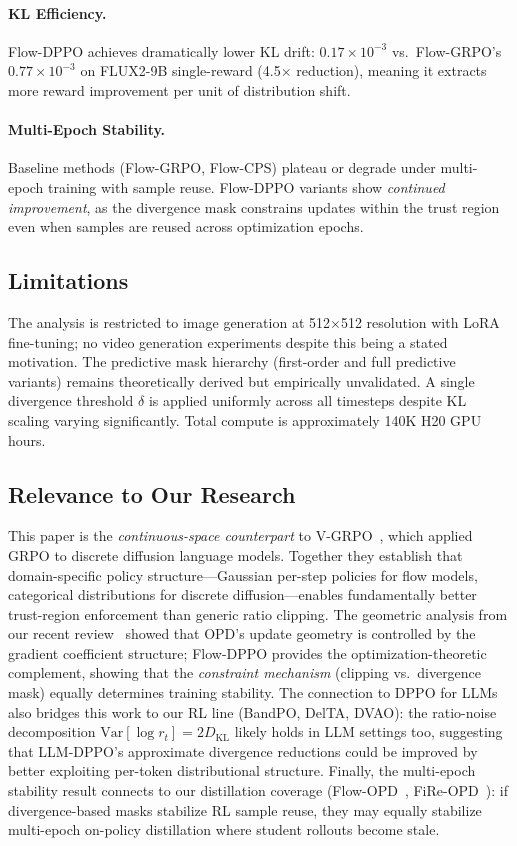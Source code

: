 \documentclass[11pt,a4paper]{article}
\begin{document}
\paragraph{KL Efficiency.} Flow-DPPO achieves dramatically lower KL drift: $0.17 \times 10^{-3}$ vs.\ Flow-GRPO's $0.77 \times 10^{-3}$ on FLUX2-9B single-reward (4.5$\times$ reduction), meaning it extracts more reward improvement per unit of distribution shift.

\paragraph{Multi-Epoch Stability.} Baseline methods (Flow-GRPO, Flow-CPS) plateau or degrade under multi-epoch training with sample reuse. Flow-DPPO variants show \emph{continued improvement}, as the divergence mask constrains updates within the trust region even when samples are reused across optimization epochs.

\subsection{Limitations}

The analysis is restricted to image generation at 512$\times$512 resolution with LoRA fine-tuning; no video generation experiments despite this being a stated motivation. The predictive mask hierarchy (first-order and full predictive variants) remains theoretically derived but empirically unvalidated. A single divergence threshold $\delta$ is applied uniformly across all timesteps despite KL scaling varying significantly. Total compute is approximately 140K H20 GPU hours.

\subsection{Relevance to Our Research}

This paper is the \emph{continuous-space counterpart} to V-GRPO~\cite{li2026vgrpo}, which applied GRPO to discrete diffusion language models. Together they establish that domain-specific policy structure---Gaussian per-step policies for flow models, categorical distributions for discrete diffusion---enables fundamentally better trust-region enforcement than generic ratio clipping. The geometric analysis from our recent review~\cite{shen2026geometry} showed that OPD's update geometry is controlled by the gradient coefficient structure; Flow-DPPO provides the optimization-theoretic complement, showing that the \emph{constraint mechanism} (clipping vs.\ divergence mask) equally determines training stability. The connection to DPPO for LLMs~\cite{qi2026dppo} also bridges this work to our RL line (BandPO, DelTA, DVAO): the ratio-noise decomposition $\mathrm{Var}[\log r_t] = 2D_{\mathrm{KL}}$ likely holds in LLM settings too, suggesting that LLM-DPPO's approximate divergence reductions could be improved by better exploiting per-token distributional structure. Finally, the multi-epoch stability result connects to our distillation coverage (Flow-OPD~\cite{fu2026flowopd}, FiRe-OPD~\cite{li2026fireopd}): if divergence-based masks stabilize RL sample reuse, they may equally stabilize multi-epoch on-policy distillation where student rollouts become stale.
\end{document}
